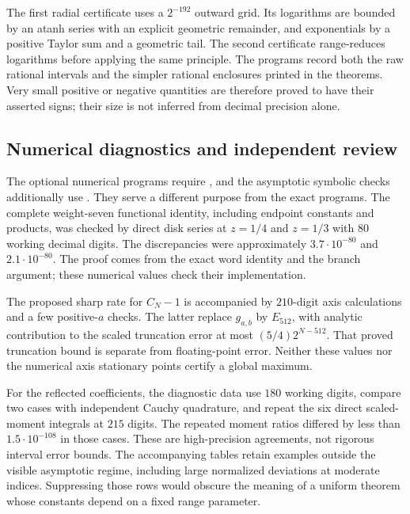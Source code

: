 The first radial certificate uses a $2^{-192}$ outward grid.
Its logarithms are bounded by an atanh series with an explicit
geometric remainder, and exponentials by a positive Taylor sum
and a geometric tail. The second certificate range-reduces
logarithms before applying the same principle. The programs
record both the raw rational intervals and the simpler rational
enclosures printed in the theorems. Very small positive or
negative quantities are therefore proved to have their asserted
signs; their size is not inferred from decimal precision alone.

\subsection{Numerical diagnostics and independent review}

The optional numerical programs require , and the
asymptotic symbolic checks additionally use .
They serve a different purpose from the exact programs.
The complete weight-seven functional identity, including
endpoint constants and products, was checked by direct disk
series at $z=1/4$ and $z=1/3$ with $80$ working decimal digits.
The discrepancies were approximately $3.7\cdot10^{-80}$ and
$2.1\cdot10^{-80}$. The proof comes from the exact word
identity and the branch argument; these numerical values
check their implementation.

The proposed sharp rate for $C_N-1$ is accompanied by $210$-digit
axis calculations and a few positive-$a$ checks. The latter replace
$g_{a,b}$ by $E_{512}$, with analytic contribution to the scaled
truncation error at most $(5/4)2^{N-512}$. That proved truncation
bound is separate from floating-point error. Neither these values
nor the numerical axis stationary points certify a global maximum.

For the reflected coefficients, the diagnostic data use $180$
working digits, compare two cases with independent Cauchy
quadrature, and repeat the six direct scaled-moment integrals
at $215$ digits. The repeated moment ratios differed by less
than $1.5\cdot10^{-108}$ in those cases. These are high-precision
agreements, not rigorous interval error bounds.
The accompanying tables retain examples outside the visible
asymptotic regime, including large normalized deviations at
moderate indices. Suppressing those rows would obscure the
meaning of a uniform theorem whose constants depend on a
fixed range parameter.

